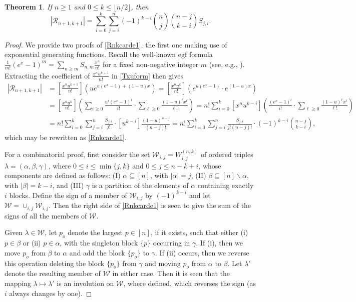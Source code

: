 \documentclass[11pt,a4paper]{article}
\newtheorem{theorem}{Theorem}[section]
\begin{document}
\begin{theorem}\label{Rnkcard}
If $n \geq1$ and $0 \leq k \leq \lfloor n/2 \rfloor$, then
\begin{equation}\label{Rnkcarde1}
|\mathcal{R}_{n+1,k+1}|=\sum_{i=0}^k\sum_{j=i}^n (-1)^{k-i}\binom{n}{j}\binom{n-j}{k-i}S_{j,i}.
\end{equation}
\end{theorem}
\begin{proof}
We provide two proofs of \eqref{Rnkcarde1}, the first one making use of exponential generating functions.  Recall the well-known egf formula $\frac{1}{m!}(e^x-1)^m=\sum_{n\geq m}S_{n,m}\frac{x^n}{n!}$ for a fixed non-negative integer $m$ (see, e.g., \cite[p.\,34]{Stan}).  Extracting the coefficient of $\frac{x^nu^{k+1}}{n!}$ in \eqref{Txuform} then gives
\begin{align*}
|\mathcal{R}_{n+1,k+1}|&=\left[\frac{x^nu^{k+1}}{n!}\right]\left(ue^{u(e^x-1)+(1-u)x}\right)=\left[\frac{x^nu^k}{n!}\right]\left(e^{u(e^x-1)}\cdot e^{(1-u)x}\right)\\
&=\left[\frac{x^nu^k}{n!}\right]\left(\sum_{i\geq0}\frac{u^i(e^x-1)^i}{i!}\cdot\sum_{\ell\geq0}\frac{(1-u)^\ell x^\ell}{\ell !}\right)=n!\sum_{i=0}^k[x^nu^{k-i}]\left(\frac{(e^x-1)^i}{i!}\cdot\sum_{\ell \geq0}\frac{(1-u)^\ell x^\ell}{\ell !}\right)\\
&=n!\sum_{i=0}^k\sum_{j=i}^n\frac{S_{j,i}}{j!}\cdot [u^{k-i}]\frac{(1-u)^{n-j}}{(n-j)!}=n!\sum_{i=0}^k\sum_{j=i}^n \frac{S_{j,i}}{j!(n-j)!}\cdot (-1)^{k-i}\binom{n-j}{k-i},
\end{align*}
which may be rewritten as \eqref{Rnkcarde1}.

For a combinatorial proof, first consider the set $\mathcal{W}_{i,j}=W_{i,j}^{(n,k)}$ of ordered triples $\lambda=(\alpha,\beta,\gamma)$, where $0 \leq i \leq \min\{j,k\}$ and $0 \leq j \leq n-k+i$, whose components are defined as follows:  (I) $\alpha \subseteq [n]$, with $|\alpha|=j$, (II) $\beta \subseteq [n] \backslash \alpha$,  with $|\beta|=k-i$, and (III) $\gamma$ is a partition of the elements of $\alpha$ containing exactly $i$ blocks.  Define the sign of a member of $\mathcal{W}_{i,j}$ by $(-1)^{k-i}$ and let $\mathcal{W}=\cup_{i,j}\mathcal{W}_{i,j}$.  Then the right side of \eqref{Rnkcarde1} is seen to give the sum of the signs of all the members of $\mathcal{W}$.

Given $\lambda \in \mathcal{W}$, let $p_o$ denote the largest $p \in [n]$, if it exists, such that either (i) $p \in \beta$ or (ii) $p \in \alpha$, with the singleton block $\{p\}$ occurring in $\gamma$.  If (i), then we move $p_o$ from $\beta$ to $\alpha$ and add the block $\{p_o\}$ to $\gamma$.  If (ii) occurs, then we reverse this operation deleting the block $\{p_o\}$ from $\gamma$ and moving $p_o$ from $\alpha$ to $\beta$.
Let $\lambda'$ denote the resulting member of $\mathcal{W}$ in either case.  Then it is seen that the mapping $\lambda \mapsto \lambda'$ is an involution on $\mathcal{W}$, where defined, which reverses the sign (as $i$ always changes by one).


\end{proof}
\end{document}
